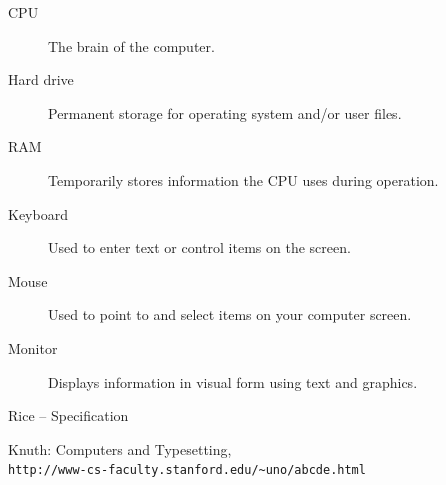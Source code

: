 \documentclass{Metanorma}
\begin{document}
  \begin{description}
    \item[CPU] The brain of the computer.
    \item[Hard drive] Permanent storage for operating system and/or user files.
    \item[RAM] Temporarily stores information the CPU uses during operation.
    \item[Keyboard] Used to enter text or control items on the screen.
    \item[Mouse] Used to point to and select items on your computer screen.
    \item[Monitor] Displays information in visual form using text and graphics.
  \end{description}


  \begin{thebibliography}{2}
     Rice -- Specification

      Knuth: Computers and Typesetting,
      \\\texttt{http://www-cs-faculty.stanford.edu/\~{}uno/abcde.html}
  \end{thebibliography}
\end{document}

